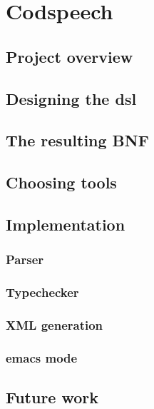 \chapter{Codspeech}
\lipsum

\section{Project overview}

\section{Designing the dsl}

\section{The resulting BNF}



\section{Choosing tools}

\section{Implementation}

\subsection{Parser}
\subsection{Typechecker}
\subsection{XML generation}
\subsection{emacs mode}

\section{Future work}
